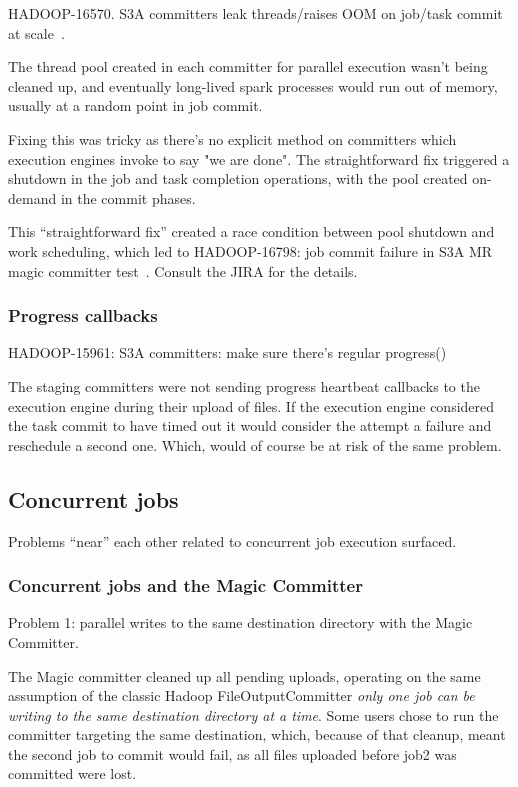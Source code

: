 \documentclass[conference]{IEEEtran}
\begin{document}
HADOOP-16570. S3A committers leak threads/raises OOM on job/task commit at scale\ \cite{HADOOP-16570}.

The thread pool created in each committer for parallel execution wasn't being
cleaned up, and eventually long-lived spark processes would run out of memory,
usually at a random point in job commit.

Fixing this was tricky as there's no explicit method on committers which
execution engines invoke to say "we are done".
The straightforward fix triggered a shutdown in the job and task completion
operations, with the pool created on-demand in the commit phases.

This ``straightforward fix'' created a race condition between pool shutdown
and work scheduling, which led to HADOOP-16798: job commit failure in S3A
MR magic committer test\ \cite{HADOOP-16570}.
Consult the JIRA for the details.



\subsubsection{Progress callbacks}
\label{subsec:progress-callbacks}

HADOOP-15961: S3A committers: make sure there's regular progress()

The staging committers were not sending progress heartbeat callbacks
to the execution engine during their upload of files.
If the execution engine considered the task commit to have timed out
it would consider the attempt a failure and reschedule a second one.
Which, would of course be at risk of the same problem.



\subsection{Concurrent jobs}
\label{subsec:concurrent-jobs}

Problems ``near'' each other related to concurrent job execution surfaced.

\subsubsection{Concurrent jobs and the Magic Committer}

Problem 1: parallel writes to the same destination directory with the Magic Committer.

The Magic committer cleaned up all pending uploads,
operating on the same assumption of the classic Hadoop FileOutputCommitter
\emph{only one job can be writing to the same destination directory at a time}.
Some users chose to run the committer targeting the same destination, which,
because of that cleanup, meant the second job to commit would fail, as all
files uploaded before job2 was committed were lost.
\end{document}
